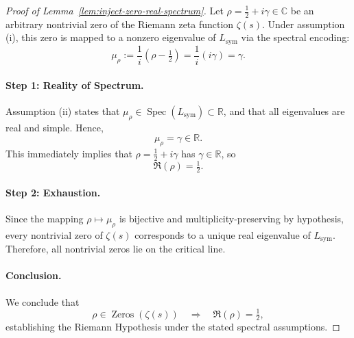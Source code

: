 \begin{proof}[Proof of Lemma~\ref{lem:inject-zero-real-spectrum}]
Let \( \rho = \tfrac{1}{2} + i\gamma \in \mathbb{C} \) be an arbitrary nontrivial zero of the Riemann zeta function \( \zeta(s) \). Under assumption (i), this zero is mapped to a nonzero eigenvalue of \( L_{\mathrm{sym}} \) via the spectral encoding:
\[
\mu_\rho := \frac{1}{i}(\rho - \tfrac{1}{2}) = \frac{1}{i}(i\gamma) = \gamma.
\]

\paragraph{Step 1: Reality of Spectrum.}
Assumption (ii) states that \( \mu_\rho \in \operatorname{Spec}(L_{\mathrm{sym}}) \subset \mathbb{R} \), and that all eigenvalues are real and simple. Hence,
\[
\mu_\rho = \gamma \in \mathbb{R}.
\]
This immediately implies that \( \rho = \tfrac{1}{2} + i\gamma \) has \( \gamma \in \mathbb{R} \), so
\[
\Re(\rho) = \tfrac{1}{2}.
\]

\paragraph{Step 2: Exhaustion.}
Since the mapping \( \rho \mapsto \mu_\rho \) is bijective and multiplicity-preserving by hypothesis, every nontrivial zero of \( \zeta(s) \) corresponds to a unique real eigenvalue of \( L_{\mathrm{sym}} \). Therefore, all nontrivial zeros lie on the critical line.

\paragraph{Conclusion.}
We conclude that
\[
\rho \in \operatorname{Zeros}(\zeta(s)) \quad \Longrightarrow \quad \Re(\rho) = \tfrac{1}{2},
\]
establishing the Riemann Hypothesis under the stated spectral assumptions.
\end{proof}
